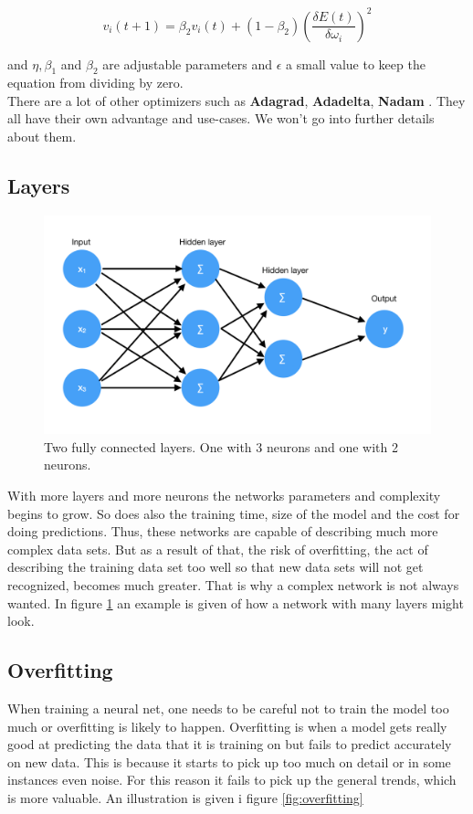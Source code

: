 \[ v_i (t+1) = \beta_2v_i(t) + (1 - \beta_2) (\frac{ \delta E(t) }{\delta\omega_i})^2 \]

and $ \eta, \beta_1 $ and $ \beta_2 $ are adjustable parameters and $ \epsilon $ a small value to keep the equation from dividing by zero.\\

There are a lot of other optimizers such as \textbf{Adagrad}, \textbf{Adadelta}, 
\textbf{Nadam} \cite{optimizers}. They all have their own advantage and use-cases.
We won't go into further details about them.

\subsection{Layers}

\begin{figure}[hbtp]
\begin{center}
\includegraphics[width = 1.0\textwidth]{./Images/fully_connected.jpg} 
\caption{Two fully connected layers. One with 3 neurons and one with 2 neurons.}
\label{fig:layers}
\end{center}
\end{figure}

With more layers and more neurons the networks parameters and complexity begins to grow. So does also the training time, size of the model and the cost for doing predictions. 
Thus, these networks are capable of describing much more complex data sets. But as a result of that, the risk of overfitting, the act of describing the training data set too well so that new data sets will not get recognized, becomes much greater.
That is why a complex network is not always wanted.
In figure \ref{fig:layers} an example is given of how a network with many layers might look.

\subsection{Overfitting}
\label{overfitting}
When training a neural net, one needs to be careful not to train the model too much or overfitting is likely to happen.
Overfitting is when a model gets really good at predicting the data that it is training on but fails to predict accurately on new data.
This is because it starts to pick up too much on detail or in some instances even noise.
For this reason it fails to pick up the general trends, which is more valuable.
An illustration is given i figure \ref{fig:overfitting}

